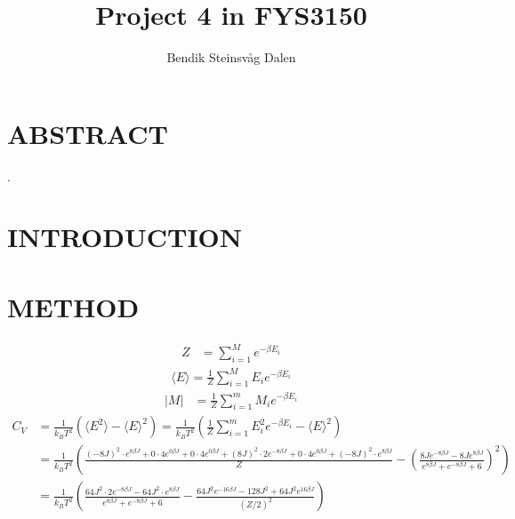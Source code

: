 \documentclass[a4paper]{article}
\title{Project 4 in FYS3150}
\author{Bendik Steinsvåg Dalen}
\begin{document}
\maketitle



\section{ABSTRACT}
.

\section{INTRODUCTION}


\section{METHOD}
\begin{align*}
Z &= \sum_{i=1}^{M} e^{-\beta E_i} 
\end{align*}
\begin{align*}
\langle E \rangle = \frac{1}{Z} \sum_{i=1}^{M} E_i e^{-\beta E_i} 
\end{align*}
\begin{align*}
|M| &= \frac{1}{Z} \sum_{i=1}^{m} M_i e^{-\beta E_i}
\end{align*}
\begin{align*}
C_V &= \frac{1}{k_BT^2} \left( \langle E^2 \rangle - \langle E \rangle ^2 \right)
= \frac{1}{k_BT^2} \left( \frac{1}{Z} \sum_{i=1}^{m} E_i^2 e^{-\beta E_i} - \langle E \rangle ^2 \right) \\
&= 
\frac{1}{k_BT^2} 
\left( \frac{ (-8J)^2 \cdot e^{8\beta J} + 0 \cdot 4e^{0\beta J} + 0\cdot 4e^{0\beta J} + (8J)^2\cdot 2e^{-8\beta J} + 0\cdot 4e^{0\beta J} +(-8J)^2 \cdot e^{8\beta J} }{Z}
 - \left( \frac{8 J e^{- 8\beta J} - 8 J e^{8\beta J} }{e^{8\beta J} + e^{-8\beta J} + 6} \right)  ^2 \right)\\
&= \frac{1}{k_BT^2} 
\left( \frac{ 64J^2 \cdot 2e^{-8\beta J} - 64J^2 \cdot e^{8\beta J} }{e^{8\beta J} + e^{-8\beta J} + 6 }
-  \frac{64J^2 e^{- 16\beta J} - 128 J^2 + 64J^2 e^{16\beta J}}{(Z/2)^2} \right)
\end{align*}
\end{document}
